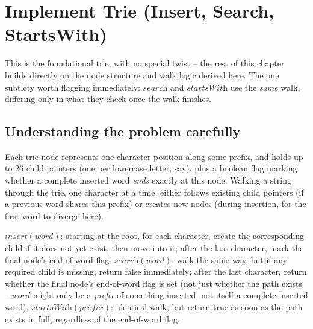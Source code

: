 \section{Implement Trie (Insert, Search, StartsWith)}
\label{sec:trie-implement}


\begin{patternbox}
This is the foundational trie, with no special twist -- the rest of this
chapter builds directly on the node structure and walk logic derived
here. The one subtlety worth flagging immediately: $\textit{search}$ and
$\textit{startsWith}$ use the \emph{same} walk, differing only in what
they check once the walk finishes.
\end{patternbox}

\subsection*{Understanding the problem carefully}

Each trie node represents one character position along some prefix, and
holds up to $26$ child pointers (one per lowercase letter, say), plus a
boolean flag marking whether a complete inserted word \emph{ends} exactly
at this node. Walking a string through the trie, one character at a
time, either follows existing child pointers (if a previous word shares
this prefix) or creates new nodes (during insertion, for the first word
to diverge here).

\begin{ideabox}
$\textit{insert}(word)$: starting at the root, for each character,
create the corresponding child if it does not yet exist, then move into
it; after the last character, mark the final node's end-of-word flag.
$\textit{search}(word)$: walk the same way, but if any required child is
missing, return false immediately; after the last character, return
whether the final node's end-of-word flag is set (not just whether the
path exists -- $word$ might only be a \emph{prefix} of something
inserted, not itself a complete inserted word). $\textit{startsWith}
(prefix)$: identical walk, but return true as soon as the path exists in
full, regardless of the end-of-word flag.
\end{ideabox}

